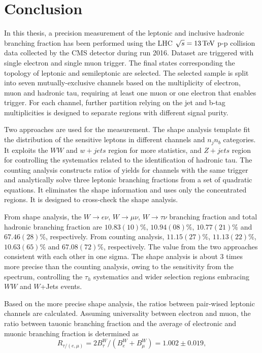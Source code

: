 \chapter{Conclusion}
\label{sec:conclusion}


In this thesis, a precision measurement of the \PW leptonic and inclusive hadronic branching fraction has been performed using the LHC $\sqrt{s}=13\,\text{Te\hspace{-.08em}V}$ p-p collision data collected by the CMS detector during run 2016. 
Dataset are triggered with single electron and single muon trigger. The final states corresponding the topology of leptonic and semileptonic \ttbar are selected. 
The selected sample is split into seven mutually-exclusive channels based on the multiplicity of electron, muon and hadronic tau, requiring at least one muon or one electron that enables trigger.
For each channel, further partition relying on the jet and b-tag multiplicities is designed to separate regions with different signal purity.

Two approaches are used for the measurement. The shape analysis template fit the \pt distribution of the sensitive leptons in different channels and $n_j n_b$ categories. It exploits the $WW$ and $w+jets$ region for more \PW statistics, and $Z+jets$ region for controlling the systematics related to the identification of hadronic tau. The counting analysis constructs ratios of yields for channels with the same trigger and analytically solve three leptonic branching fractions from a set of quadratic equations. It eliminates the shape information and uses only the \ttbar concentrated regions. It is designed to cross-check the shape analysis. 


From shape analysis, the $W\to e\nu$, $W\to \mu\nu$, $W\to \tau\nu$ branching fraction and \PW total hadronic branching fraction are $10.83(10)\%$, $10.94(08)\%$, $10.77(21)\%$ and $67.46(28)\%$, respectively.
From counting analysis, $11.15(27)\%$, $11.13(22)\%$, $10.63(65)\%$ and $67.08(72)\%$, respectively. The value from the two approaches consistent with each other in one sigma. The shape analysis is about 3 times more precise than the counting analysis, owing to the sensitivity from the \pt spectrum, controlling the $\tau_h$ systematics and wider selection regions embracing $WW$ and $W$+Jets events. 

Based on the more precise shape analysis, the ratios between pair-wised leptonic channels are calculated. Assuming universality between electron and muon, the ratio between tauonic branching fraction and the average of electronic and muonic branching fraction is determined as
\begin{equation*}
    R_{\tau/(e,\mu)} = 2 B^W_\tau /(B^W_e +  B^W_\mu) = 1.002\pm0.019,
\end{equation*}

